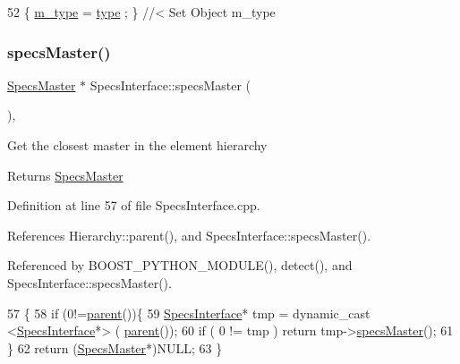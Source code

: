 \begin{DoxyCode}
52 \{ \hyperlink{classObject_a457a600fe8c00eb1034374f75110a78c}{m\_type}  = \hyperlink{classObject_a84f99f70f144a83e1582d1d0f84e4e62}{type}  ; \} \textcolor{comment}{//< Set Object m\_type}
\end{DoxyCode}
\mbox{\label{classSpecsInterface_a3d497c965fb6ec06b49a54b7901a22b2}} 
\subsubsection{\texorpdfstring{specs\+Master()}{specsMaster()}}
{\footnotesize\ttfamily \hyperlink{classSpecsMaster}{Specs\+Master} $\ast$ Specs\+Interface\+::specs\+Master (\begin{DoxyParamCaption}{ }\end{DoxyParamCaption})\hspace{0.3cm}{\ttfamily [virtual]}, {\ttfamily [inherited]}}

Get the closest master in the element hierarchy \begin{DoxyReturn}{Returns}
\hyperlink{classSpecsMaster}{Specs\+Master} 
\end{DoxyReturn}


Definition at line 57 of file Specs\+Interface.\+cpp.



References Hierarchy\+::parent(), and Specs\+Interface\+::specs\+Master().



Referenced by B\+O\+O\+S\+T\+\_\+\+P\+Y\+T\+H\+O\+N\+\_\+\+M\+O\+D\+U\+L\+E(), detect(), and Specs\+Interface\+::specs\+Master().


\begin{DoxyCode}
57                                         \{
58     \textcolor{keywordflow}{if} (0!=\hyperlink{classHierarchy_a1c7bec8257e717f9c1465e06ebf845fc}{parent}())\{
59     \hyperlink{classSpecsInterface}{SpecsInterface}* tmp = dynamic\_cast <\hyperlink{classSpecsInterface}{SpecsInterface}*> (
      \hyperlink{classHierarchy_a1c7bec8257e717f9c1465e06ebf845fc}{parent}());
60     \textcolor{keywordflow}{if} ( 0 != tmp ) \textcolor{keywordflow}{return} tmp->\hyperlink{classSpecsInterface_a3d497c965fb6ec06b49a54b7901a22b2}{specsMaster}();
61   \}
62   \textcolor{keywordflow}{return} (\hyperlink{classSpecsMaster}{SpecsMaster}*)NULL;
63 \}
\end{DoxyCode}
\mbox{\label{classSpecsInterface_aa8aeaa74acf2c913905ea996d153a6ef}} 
